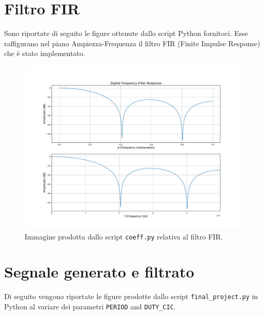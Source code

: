 \documentclass[a4paper,11pt]{article}
\begin{document}


\section{Filtro FIR}
Sono riportate di seguito le figure ottenute dallo script Python fornitoci. Esse raffigurano nel piano Ampiezza-Frequenza il filtro FIR (Finite Impulse Response) che è stato implementato.

\begin{figure}[htp]
    \centering
    \includegraphics[width=.9\textwidth]{./Figure/f_response.pdf}
    \caption{Immagine prodotta dallo script \texttt{coeff.py} relativa al filtro FIR.}
    \label{fig:filter}
\end{figure}

\newpage
\section{Segnale generato e filtrato}
Di seguito vengono riportate le figure prodotte dallo script \texttt{final\_project.py} in Python al variare dei parametri \texttt{PERIOD} and \texttt{DUTY\_CIC}.
\end{document}
